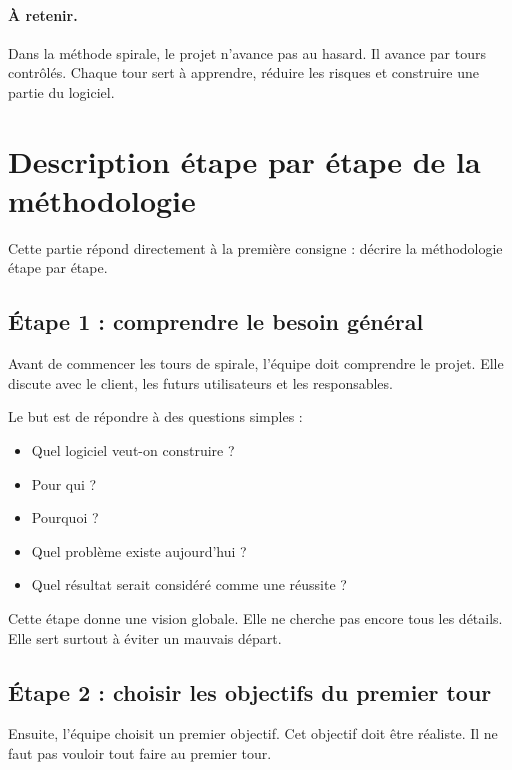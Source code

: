 \documentclass[12pt,a4paper]{article}
\begin{document}
\paragraph{À retenir.}
Dans la méthode spirale, le projet n'avance pas au hasard. Il avance par tours contrôlés. Chaque tour sert à apprendre, réduire les risques et construire une partie du logiciel.

\newpage

\section{Description étape par étape de la méthodologie}

Cette partie répond directement à la première consigne : décrire la méthodologie étape par étape.

\subsection{Étape 1 : comprendre le besoin général}

Avant de commencer les tours de spirale, l'équipe doit comprendre le projet. Elle discute avec le client, les futurs utilisateurs et les responsables.

Le but est de répondre à des questions simples :

\begin{itemize}
    \item Quel logiciel veut-on construire ?
    \item Pour qui ?
    \item Pourquoi ?
    \item Quel problème existe aujourd'hui ?
    \item Quel résultat serait considéré comme une réussite ?
\end{itemize}

Cette étape donne une vision globale. Elle ne cherche pas encore tous les détails. Elle sert surtout à éviter un mauvais départ.

\subsection{Étape 2 : choisir les objectifs du premier tour}

Ensuite, l'équipe choisit un premier objectif. Cet objectif doit être réaliste. Il ne faut pas vouloir tout faire au premier tour.
\end{document}
